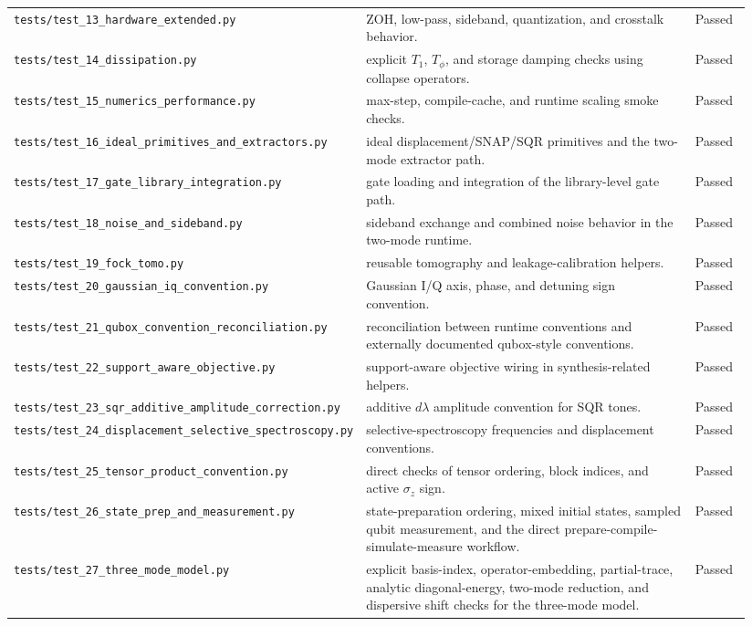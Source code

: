 \documentclass[11pt]{article}
\begin{document}
\begin{longtable}{p{0.30\linewidth} p{0.56\linewidth} p{0.08\linewidth}}
\texttt{tests/test\_13\_hardware\_extended.py} & ZOH, low-pass, sideband, quantization, and crosstalk behavior. & Passed \\
\texttt{tests/test\_14\_dissipation.py} & explicit \(T_1\), \(T_\phi\), and storage damping checks using collapse operators. & Passed \\
\texttt{tests/test\_15\_numerics\_performance.py} & max-step, compile-cache, and runtime scaling smoke checks. & Passed \\
\texttt{tests/test\_16\_ideal\_primitives\_and\_extractors.py} & ideal displacement/SNAP/SQR primitives and the two-mode extractor path. & Passed \\
\texttt{tests/test\_17\_gate\_library\_integration.py} & gate loading and integration of the library-level gate path. & Passed \\
\texttt{tests/test\_18\_noise\_and\_sideband.py} & sideband exchange and combined noise behavior in the two-mode runtime. & Passed \\
\texttt{tests/test\_19\_fock\_tomo.py} & reusable tomography and leakage-calibration helpers. & Passed \\
\texttt{tests/test\_20\_gaussian\_iq\_convention.py} & Gaussian I/Q axis, phase, and detuning sign convention. & Passed \\
\texttt{tests/test\_21\_qubox\_convention\_reconciliation.py} & reconciliation between runtime conventions and externally documented qubox-style conventions. & Passed \\
\texttt{tests/test\_22\_support\_aware\_objective.py} & support-aware objective wiring in synthesis-related helpers. & Passed \\
\texttt{tests/test\_23\_sqr\_additive\_amplitude\_correction.py} & additive \(d\lambda\) amplitude convention for SQR tones. & Passed \\
\texttt{tests/test\_24\_displacement\_selective\_spectroscopy.py} & selective-spectroscopy frequencies and displacement conventions. & Passed \\
\texttt{tests/test\_25\_tensor\_product\_convention.py} & direct checks of tensor ordering, block indices, and active \(\sigma_z\) sign. & Passed \\
\texttt{tests/test\_26\_state\_prep\_and\_measurement.py} & state-preparation ordering, mixed initial states, sampled qubit measurement, and the direct prepare-compile-simulate-measure workflow. & Passed \\
\texttt{tests/test\_27\_three\_mode\_model.py} & explicit basis-index, operator-embedding, partial-trace, analytic diagonal-energy, two-mode reduction, and dispersive shift checks for the three-mode model. & Passed \\

\end{longtable}
\end{document}
